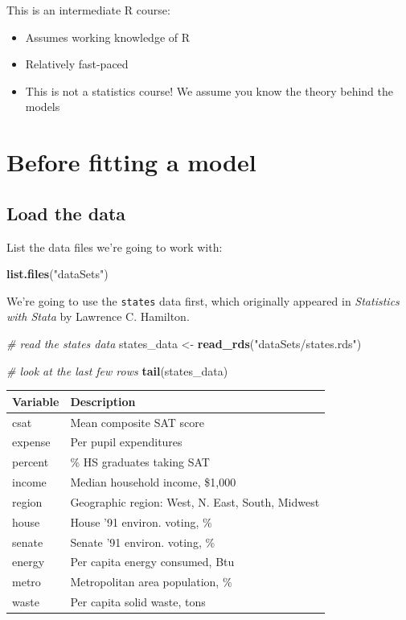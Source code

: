 \documentclass[]{book}
\newenvironment{Shaded}{\begin{snugshade}}{\end{snugshade}}
\newcommand{\KeywordTok}[1]{\textcolor[rgb]{0.13,0.29,0.53}{\textbf{#1}}}
\newcommand{\StringTok}[1]{\textcolor[rgb]{0.31,0.60,0.02}{#1}}
\newcommand{\CommentTok}[1]{\textcolor[rgb]{0.56,0.35,0.01}{\textit{#1}}}
\newcommand{\NormalTok}[1]{#1}
\providecommand{\tightlist}{%
  \setlength{\itemsep}{0pt}\setlength{\parskip}{0pt}}
\begin{document}
This is an intermediate R course:

\begin{itemize}
\tightlist
\item
  Assumes working knowledge of R
\item
  Relatively fast-paced
\item
  This is not a statistics course! We assume you know the theory behind
  the models
\end{itemize}

\section{Before fitting a model}\label{before-fitting-a-model}

\subsection{Load the data}\label{load-the-data}

List the data files we're going to work with:

\begin{Shaded}
\begin{Highlighting}[]
\KeywordTok{list.files}\NormalTok{(}\StringTok{"dataSets"}\NormalTok{)}
\end{Highlighting}
\end{Shaded}

We're going to use the \texttt{states} data first, which originally
appeared in \emph{Statistics with Stata} by Lawrence C. Hamilton.

\begin{Shaded}
\begin{Highlighting}[]
  \CommentTok{# read the states data}
\NormalTok{  states_data <-}\StringTok{ }\KeywordTok{read_rds}\NormalTok{(}\StringTok{"dataSets/states.rds"}\NormalTok{) }

  \CommentTok{# look at the last few rows}
  \KeywordTok{tail}\NormalTok{(states_data)}
\end{Highlighting}
\end{Shaded}

\begin{longtable}[]{@{}ll@{}}
\toprule
Variable & Description\tabularnewline
\midrule
\endhead
csat & Mean composite SAT score\tabularnewline
expense & Per pupil expenditures\tabularnewline
percent & \% HS graduates taking SAT\tabularnewline
income & Median household income, \$1,000\tabularnewline
region & Geographic region: West, N. East, South, Midwest\tabularnewline
house & House '91 environ. voting, \%\tabularnewline
senate & Senate '91 environ. voting, \%\tabularnewline
energy & Per capita energy consumed, Btu\tabularnewline
metro & Metropolitan area population, \%\tabularnewline
waste & Per capita solid waste, tons\tabularnewline
\bottomrule
\end{longtable}
\end{document}
